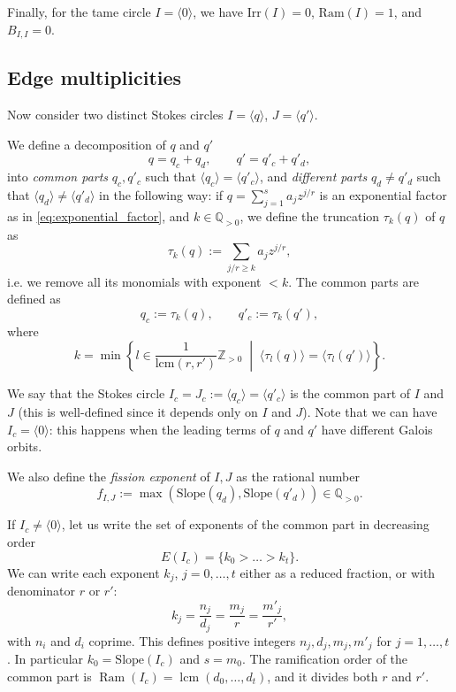 \documentclass[11pt,a4paper]{amsart}
\numberwithin{equation}{section}
\DeclareMathOperator{\Ram}{Ram}
\DeclareMathOperator{\lcm}{lcm}
\newcommand{\cir}[1]{\langle #1 \rangle}
\begin{document}
Finally, for the tame circle $I=\cir{0}$, we have $\mathrm{Irr}(I)=0$, $\mathrm{Ram}(I)=1$, and $B_{I,I}=0$.


\subsection{Edge multiplicities}

Now consider two distinct Stokes circles $I=\cir{q}$, $J=\cir{q'}$.

We define a decomposition of $q$ and $q'$
\begin{equation}
q=q_c+q_d, \qquad q'=q'_c+q'_d,
\end{equation} into \emph{common parts} $q_c, q'_c$ such that 
$\cir{q_c}=\cir{q'_c}$, and \emph{different parts} $q_d\neq q'_d$ such that $\cir{q_d}\neq\cir{q'_d}$ in the following way: if $q=\sum_{j=1}^s a_jz^{j/r}$ is an exponential factor as in \eqref{eq:exponential_factor}, and $k\in \mathbb Q_{>0}$, we define the truncation $\tau_k(q)$ of $q$ as
\[
\tau_k(q):=\sum_{j/r\geq k} a_j z^{j/r},
\]
i.e. we remove all its monomials with exponent $<k$. The common parts are defined as 
\[
q_c:=\tau_k(q), \qquad q'_c:=\tau_k(q'), 
\]
where
\[
k=\min\left\{l\in \frac{1}{\mathrm{lcm}(r, r')}\mathbb Z_{>0}\;\middle \vert\; \cir{\tau_l(q)}=\cir{\tau_l(q')}\right\}.
\]

We say that the Stokes circle $I_c=J_c:=\cir{q_c}=\cir{q'_c}$ is the common part of $I$ and $J$ (this is well-defined since it depends only on $I$ and $J$). Note that we can have $I_c=\cir{0}$: this happens when the leading terms of $q$ and $q'$ have different Galois orbits. 

We also define the \emph{fission exponent} of $I, J$ as the rational number
\begin{equation}
f_{I, J}:=\max(\mathrm{Slope}(q_d), \mathrm{Slope}(q'_d))\in \mathbb Q_{>0}.
\end{equation}

If $I_c\neq \cir{0}$, let us write the set of exponents of the common part in decreasing order
\[
E(I_c)=\{k_0>\dots > k_t\}.
\]
We can write each exponent $k_j$, $j=0, \dots, t$ either as a reduced fraction, or with denominator $r$ or $r'$:
\[
k_j=\frac{n_j}{d_j}=\frac{m_j}{r}=\frac{m'_j}{r'},
\]
with $n_i$ and $d_i$ coprime. This defines positive integers $n_j,d_j, m_j, m'_j$ for $j=1, \dots, t$. In particular $k_0=\mathrm{Slope}(I_c)$ and $s=m_0$. The ramification order of the common part is $\Ram(I_c)=\lcm(d_0, \dots, d_t)$, and it divides both $r$ and $r'$.
\end{document}
